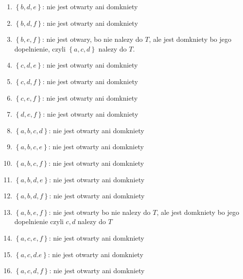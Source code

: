 \documentclass{article}
\begin{document}
\begin{enumerate}
\begin{enumerate}[label=\arabic*.]
\item $\left\{ b,d,e \right\}$: nie jest otwarty ani domkniety
\item $\left\{ b,d,f \right\}$: nie jest otwarty ani domkniety

\item $\left\{ b,e,f \right\}$: nie jest otwary, bo nie nalezy do $T$, ale jest domkniety bo jego dopelnienie, czyli $\left\{ a,c,d \right\}$ nalezy do $T$.

\item $\left\{ c,d,e \right\}$: nie jest otwarty ani domkniety
\item $\left\{ c,d,f \right\}$: nie jest otwarty ani domkniety

\item $\left\{ c,e,f \right\}$: nie jest otwarty ani domkniety

\item $\left\{ d,e,f \right\}$: nie jest otwarty ani domkniety

\item $\left\{ a,b,c,d \right\}$: nie jest otwarty ani domkniety
\item $\left\{ a,b,c,e \right\}$: nie jest otwarty ani domkniety
\item $\left\{ a,b,c,f \right\}$: nie jest otwarty ani domkniety

\item $\left\{ a,b,d,e \right\}$: nie jest otwarty ani domkniety
\item $\left\{ a,b,d,f \right\}$: nie jest otwarty ani domkniety

\item $\left\{ a,b,e,f \right\}$: nie jest otwarty bo nie nalezy do $T$, ale jest domkniety bo jego dopelnienie czyli ${c,d}$ nalezy do $T$

\item $\left\{ a,c,e,f \right\}$: nie jest otwarty ani domkniety 

\item $\left\{ a,c,d.e \right\}$: nie jest otwarty ani domkniety
\item $\left\{ a,c,d,f \right\}$: nie jest otwarty ani domkniety


\end{enumerate}
\end{enumerate}
\end{document}
